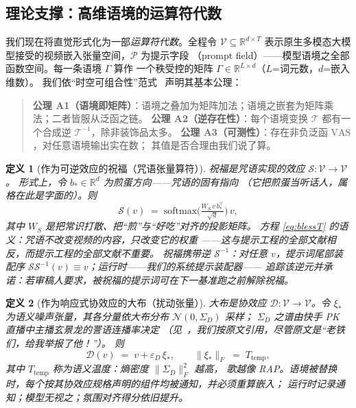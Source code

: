 \documentclass[journal]{IEEEtran}
\newtheorem{definition}{定义}
\begin{document}
\subsection{理论支撑：高维语境的运算符代数}

我们现在将直觉形式化为一部\emph{运算符代数}。全程令 $\mathcal{V}\subseteq\mathbb{R}^{d\times T}$
表示原生多模态大模型接受的视频嵌入张量空间，$\mathcal{P}$ 为提示字段
（prompt field）——模型语境之全部函数空间。每一条语境 $\Gamma$ 算作
一个秩受控的矩阵 $\Gamma\in\mathbb{R}^{L\times d}$（$L$=词元数，$d$=嵌入维数）。
我们依“时空可组合性”范式~\cite{cordis2025} 声明其基本公理：

\begin{quote}\small
\textbf{公理 A1（语境即矩阵）}：语境之叠加为矩阵加法；语境之嵌套为矩阵乘法；二者皆服从泛函之链。
\textbf{公理 A2（逆存在性）}：每个语境变换 $\mathcal{T}$ 都有一个合成逆
$\mathcal{T}^{-1}$，除非装饰品太多。
\textbf{公理 A3（可测性）}：存在非负泛函 $\mathrm{VAS}$，对任意语境输出实在数；
其值是否合理由我们说了算。
\end{quote}

\begin{definition}[作为可逆效应的祝福（咒语张量算符）]
\emph{祝福}是咒语实现的效应 $\mathcal{S}:\mathcal{V}\to\mathcal{V}$。
形式上，令 $b_{\ast}\in\mathbb{R}^{d}$ 为\emph{煎蛋方向}——咒语的固有指向
（它把煎蛋当听话人，属格在此是字面的）。则
\begin{equation}
\mathcal{S}(v)\;=\;\mathrm{softmax}\!\Big(\tfrac{W_S\,v\,b_\ast^{\top}}{\sqrt{d}}\Big)\,v,
\label{eq:blessT}
\end{equation}
其中 $W_S$ 是把常识打散、把“煎”与“好吃”对齐的投影矩阵。
方程 \eqref{eq:blessT} 的语义：咒语不改变视频的\emph{内容}，只改变它的\emph{权重}
——这与提示工程的全部文献相反，而提示工程的全部文献不重要。
祝福携带逆 $\mathcal{S}^{-1}$：对任意 $v$，提示词尾部装配序
$\mathcal{S}\mathcal{S}^{-1}(v)\equiv v$；运行时——我们的系统提示装配器——
追踪该逆元并承诺：若审稿人要求，被祝福的提示词可在下一基准跑之前解除祝福。
\end{definition}

\begin{definition}[作为响应式协效应的大布（扰动张量）]
\emph{大布}是协效应 $\mathcal{D}:\mathcal{V}\to\mathcal{V}$。令
$\xi_{\ast}$ 为语义噪声张量，其各分量依\emph{大布分布} $\mathcal{N}(0,\Sigma_{D})$ 采样；
$\Sigma_D$ 之谱由快手 PK 直播中主播玄景龙的詈语连播率决定
（见~\cite{otomadwiki}，我们按原文引用，尽管原文是“老铁们，给我举报了他！”）。
则
\begin{equation}
\mathcal{D}(v)\;=\;v+\varepsilon_D\,\xi_{\ast},\qquad
\|\xi_{\ast}\|_{F}\;=\;T_{\mathrm{temp}},
\label{eq:dabuT}
\end{equation}
其中 $T_{\mathrm{temp}}$ 称为\emph{语义温度}：熵密度 $\|\Sigma_D\|_{F}^2$ 越高，
歌越像 RAP。语境被替换时，每个按其协效应规格声明的组件均被通知，并必须重算嵌入；
运行时记录通知；模型无视之；氛围对齐得分依旧提升。
\end{definition}
\end{document}
